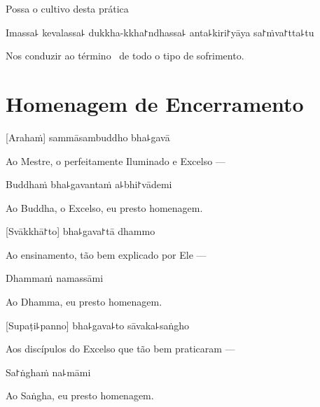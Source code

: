 \begin{english}
  Possa o cultivo desta prática
\end{english}

Imassa꜕ kevalassa꜕ dukkha-kkha꜓ndhassa꜕ anta꜕kiri꜓yāya sa꜓ṁva꜓tta꜕tu

\begin{english}
  Nos conduzir ao término \pause\ de todo o tipo de sofrimento.
\end{english}

\clearpage

\chapter{Homenagem de Encerramento}

[Arahaṁ] sammāsambuddho bha꜕gavā

\begin{english}
  Ao Mestre, o perfeitamente Iluminado e Excelso ---
\end{english}

Buddhaṁ bha꜕gavantaṁ a꜕bhi꜓vādemi

\begin{english}
  Ao Buddha, o Excelso, eu presto homenagem.
\end{english}

[Svākkhā꜓to] bha꜕gava꜓tā dhammo

\begin{english}
  Ao ensinamento, tão bem explicado por Ele ---
\end{english}

Dhammaṁ namassāmi

\begin{english}
  Ao Dhamma, eu presto homenagem.
\end{english}


[Supaṭi꜕panno] bha꜕gava꜕to sāvaka꜕saṅgho

\begin{english}
  Aos discípulos do Excelso que tão bem praticaram ---
\end{english}

Sa꜓ṅghaṁ na꜕māmi

\begin{english}
  Ao Saṅgha, eu presto homenagem.
\end{english}

